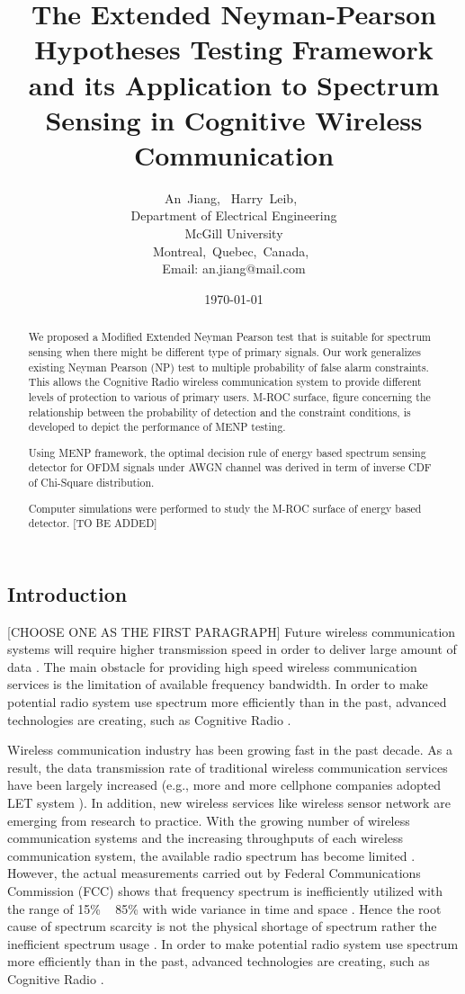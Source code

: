 \documentclass{report}
\author{An~Jiang,~
        Harry~Leib,~\\
          Department of Electrical Engineering\\
          McGill University\\
          Montreal,~Quebec,~Canada,~\\
          Email: an.jiang@mail.com}
\title{The Extended Neyman-Pearson Hypotheses Testing Framework and its Application to Spectrum Sensing in Cognitive Wireless Communication}
\date{\today}
\begin{document}
\begin{spacing}{2.0}
\maketitle
\begin{abstract}
We proposed a Modified Extended Neyman Pearson test that is suitable for spectrum sensing when there might be different type of primary signals. Our work generalizes existing Neyman Pearson (NP) test to multiple probability of false alarm constraints. This allows the Cognitive Radio wireless communication system to provide different levels of protection to various of primary users.  
M-ROC surface, figure concerning the relationship between the probability of detection and the constraint conditions, is developed to depict the performance of MENP testing. 

Using MENP framework, the optimal decision rule of energy based spectrum sensing detector for OFDM signals under AWGN channel was derived in term of inverse CDF of Chi-Square distribution.   

Computer simulations were performed to study the M-ROC surface of energy based detector. [TO BE ADDED] 
\end{abstract}
\section{Introduction}
[CHOOSE ONE AS THE FIRST PARAGRAPH]
Future wireless communication systems will require higher transmission speed in order to deliver large amount of data \cite{pelcat20133gpp}. The main obstacle for providing high speed wireless communication services is the limitation of available frequency bandwidth. In order to make potential radio system use spectrum more efficiently than in the past, advanced technologies are creating, such as Cognitive Radio \cite{nonotice}. 

Wireless communication industry has been growing fast in the past decade. As a result, the data transmission rate of traditional wireless communication services have been largely increased (e.g., more and more cellphone companies adopted LET system \cite{cox2014introduction}). In addition, new wireless services like wireless sensor network are emerging from research to practice. With the growing number of wireless communication systems and the increasing throughputs of each wireless communication system, the available radio spectrum has become limited \cite{mitola1999cognitive} \cite{federal2005notice}. However, the actual measurements carried out by Federal Communications Commission (FCC) shows that frequency spectrum is inefficiently utilized with the range of 15\% ~ 85\% with wide variance in time and space \cite{nonotice}. Hence the root cause of spectrum scarcity is not the physical shortage of spectrum rather the inefficient spectrum usage \cite{umar2013comparative}. 
In order to make potential radio system use spectrum more efficiently than in the past, advanced technologies are creating, such as Cognitive Radio \cite{nonotice}.


\end{spacing}
\end{document}
